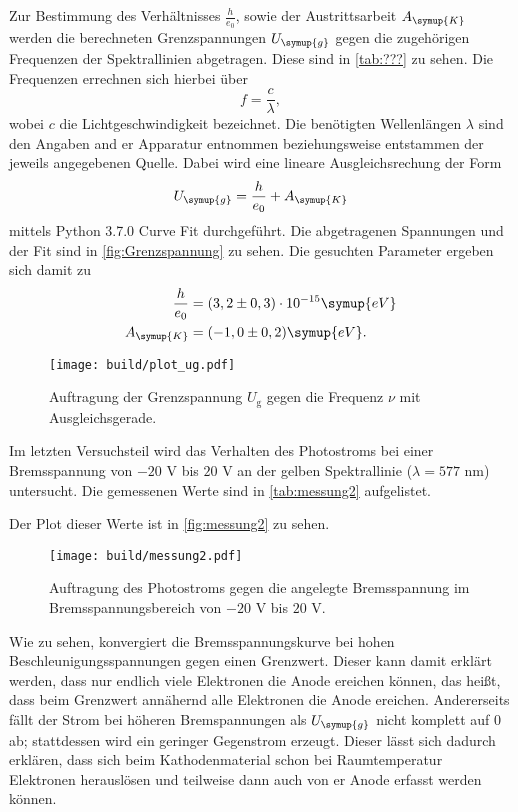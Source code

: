 Zur Bestimmung des Verhältnisses $\frac{h}{e_0}$, sowie der Austrittsarbeit $A_{\symup{K}}$ werden die berechneten Grenzspannungen $U_{\symup{g}}$
gegen die zugehörigen Frequenzen der Spektrallinien abgetragen. Diese sind in \autoref{tab:???} zu sehen. Die Frequenzen errechnen sich hierbei über 
\begin{equation}
\label{eqn:frequenz}
  f = \frac{c}{\lambda},
\end{equation}  
wobei $c$ die Lichtgeschwindigkeit bezeichnet. Die benötigten Wellenlängen $\lambda$ sind den Angaben and er Apparatur entnommen beziehungsweise
entstammen der jeweils angegebenen Quelle.
Dabei wird eine lineare Ausgleichsrechung der Form
\begin{equation}
  \label{eqn:ausgleich2}
  U_{\symup{g}} = \frac{h}{e_0} + A_{\symup{K}}
\end{equation}
mittels Python 3.7.0 Curve Fit durchgeführt. Die abgetragenen Spannungen und der Fit sind in \autoref{fig:Grenzspannung} zu sehen.
Die gesuchten Parameter ergeben sich damit zu 
\begin{align*}
  \frac{h}{e_0} &= (3,2 \pm 0,3) \cdot 10^{-15} \symup{eV} \\
  A_{\symup{K}} &= (-1,0 \pm 0,2) \symup{eV}. \\
\end{align*}  

\begin{figure}
    \centering
    \texttt{[image: build/plot\_ug.pdf]}
    \caption{Auftragung der Grenzspannung $U_\text{g}$ gegen die Frequenz $\nu$ mit Ausgleichsgerade.}
    \label{fig:Grenzspannung}
\end{figure}    

Im letzten Versuchsteil wird das Verhalten des Photostroms bei einer Bremsspannung von $-20$ V bis $20$ V an der gelben Spektrallinie
($\lambda = 577$ nm) untersucht. Die gemessenen Werte sind in \autoref{tab:messung2} aufgelistet.

Der Plot dieser Werte ist in \autoref{fig:messung2} zu sehen.
\begin{figure}
    \centering
    \texttt{[image: build/messung2.pdf]}
    \caption{Auftragung des Photostroms gegen die angelegte Bremsspannung im Bremsspannungsbereich von $-20$ V bis $20$ V.}
    \label{fig:messung2}
\end{figure}
Wie zu sehen, konvergiert die Bremsspannungskurve bei hohen Beschleunigungsspannungen gegen einen Grenzwert. Dieser
kann damit erklärt werden, dass nur 
endlich viele Elektronen die Anode ereichen können, das heißt, dass beim Grenzwert annähernd alle Elektronen die Anode ereichen.
Andererseits fällt der Strom bei höheren Bremspannungen als $U_{\symup{g}}$ nicht komplett auf 0 ab; stattdessen wird ein geringer 
Gegenstrom erzeugt. Dieser lässt sich dadurch erklären, dass sich beim Kathodenmaterial schon bei Raumtemperatur Elektronen herauslösen 
und teilweise dann auch von er Anode erfasst werden können. 